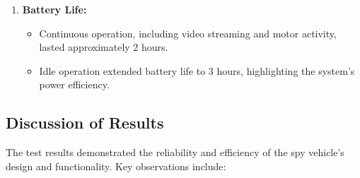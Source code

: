 \documentclass[12pt,a4paper]{report}
\begin{document}
\begin{enumerate}
    \item \textbf{Battery Life:}
    \begin{itemize}
        \item Continuous operation, including video streaming and motor activity, lasted approximately 2 hours.
        \item Idle operation extended battery life to 3 hours, highlighting the system’s power efficiency.
    \end{itemize}
\end{enumerate}



\subsection{Discussion of Results}

The test results demonstrated the reliability and efficiency of the spy vehicle’s design and functionality. Key observations include:
\end{document}
